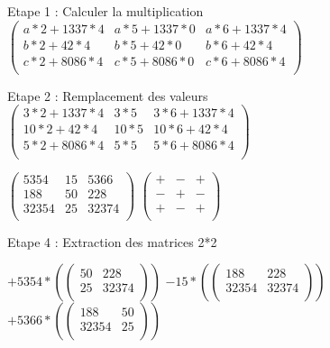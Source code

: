 Etape 1 :  Calculer la multiplication \\

\vspace{3mm} %
$
\begin{pmatrix}
  a*2+1337*4 & a*5+1337*0  & a*6+1337*4 \\
  b*2+42*4   & b*5+42*0    & b*6+42*4   \\
  c*2+8086*4 & c*5+8086*0  & c*6+8086*4 \\
\end{pmatrix}
$\vspace{5mm} %

\vspace{5mm} %

Etape 2 : Remplacement des valeurs \\

\vspace{5mm} %
$
\begin{pmatrix}
  3*2+1337*4 & 3*5  & 3*6+1337*4  \\
  10*2+42*4  & 10*5 & 10*6+42*4   \\
  5*2+8086*4 &  5*5  & 5*6+8086*4 \\
\end{pmatrix}
$

\vspace{5mm} %

$
\begin{pmatrix}
  5354 & 15 & 5366   \\
  188 &  50 & 228    \\
  32354 & 25 & 32374 \\
\end{pmatrix}
$
\vspace{5mm} %
$
\begin{pmatrix}
  + & - & + \\
  - & + & - \\
  + & - & + \\
\end{pmatrix}
$
\vspace{5mm} %

Etape 4 :  Extraction des matrices 2*2 \\

\vspace{5mm} %

$
+5354 *(
\begin{pmatrix}
  50 & 228  \\
  25 & 32374  \\
\end{pmatrix}
)
$
$
-15 *(
\begin{pmatrix}
  188 & 228  \\
  32354 & 32374  \\
\end{pmatrix}
)
$
$
+5366 *(
\begin{pmatrix}
  188 & 50  \\
  32354 & 25  \\
\end{pmatrix}
)
$

